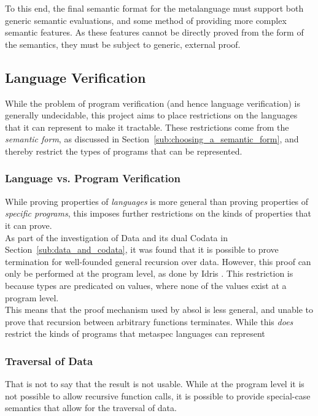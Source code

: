 To this end, the final semantic format for the metalanguage must support both generic semantic evaluations, and some method of providing more complex semantic features.
As these features cannot be directly proved from the form of the semantics, they must be subject to generic, external proof. 


\subsection{Language Verification} %
\label{sub:language_verification}
While the problem of program verification (and hence language verification) is generally undecidable, this project aims to place restrictions on the languages that it can represent to make it tractable. 
These restrictions come from the \textit{semantic form}, as discussed in Section~\ref{sub:choosing_a_semantic_form}, and thereby restrict the types of programs that can be represented.

\subsubsection{Language vs. Program Verification} %
\label{ssub:language_vs_program_verification}
While proving properties of \textit{languages} is more general than proving properties of \textit{specific programs}, this imposes further restrictions on the kinds of properties that it can prove. \\

As part of the investigation of Data and its dual Codata in Section~\ref{sub:data_and_codata}, it was found that it is possible to prove termination for well-founded general recursion over data. 
However, this proof can only be performed at the program level, as done by Idris \citep{idris_lang}. 
This restriction is because types are predicated on values, where none of the
values exist at a program level. \\

This means that the proof mechanism used by \gls{absol} is less general, and unable to prove that recursion between arbitrary functions terminates.
While this \textit{does} restrict the kinds of programs that metaspec languages can represent


\subsubsection{Traversal of Data} %
\label{ssub:traversal_of_data}
That is not to say that the result is not usable.
While at the program level it is not possible to allow recursive function calls, it is possible to provide special-case semantics that allow for the traversal of data. \\

